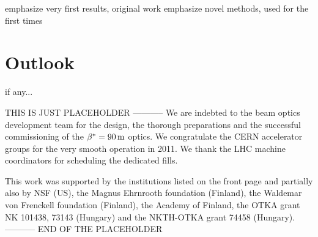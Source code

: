 \documentclass[pdftex,twocolumn,epjc3]{svjour3}
\def\un#1{\,{\rm #1}}
\def\hang{\hangindent=\parindent}
\def\>{\par\vskip\itskip\parindent\itindent\indent\hang\llap{\hbox to3mm{$\bullet$\hss}}}
\def\>E{\par\vskip\itskip\parindent\itindent\indent\hang\llap{\hbox to3mm{\hss}}}
\def\>>{\par\vskip\iitskip\parindent\iitindent\indent\hang\llap{\hbox to\iitindent{\hss--\ }}}
\begin{document}
\> emphasize very first results, original work
\> emphasize novel methods, used for the first times



\section{Outlook}

\> if any...





\begin{acknowledgements}
THIS IS JUST PLACEHOLDER -----------
We are indebted to the beam optics development team
for the design, the thorough preparations and the successful commissioning of the $\beta^* = 90\un{m}$ optics. We congratulate the CERN accelerator groups for the very smooth operation in 2011. We thank
the LHC machine coordinators for scheduling the dedicated fills.

This work was supported by the institutions listed on the front page and partially also by NSF (US), the Magnus
Ehrnrooth foundation (Finland), the Waldemar von Frenckell foundation (Finland), the Academy of
Finland, the OTKA grant NK 101438, 73143 (Hungary) and the NKTH-OTKA grant 74458 (Hungary).
----------- END OF THE PLACEHOLDER
\end{acknowledgements}
\end{document}
